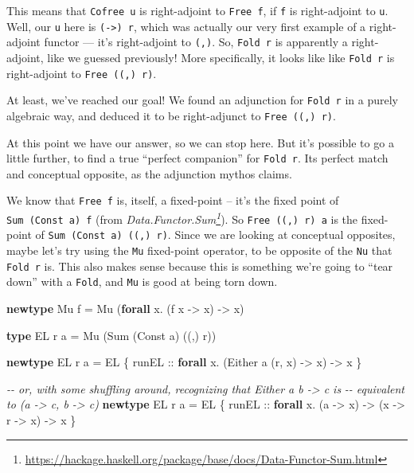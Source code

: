 \documentclass[]{article}
\newenvironment{Shaded}{}{}
\newcommand{\CommentTok}[1]{\textcolor[rgb]{0.38,0.63,0.69}{\textit{#1}}}
\newcommand{\DataTypeTok}[1]{\textcolor[rgb]{0.56,0.13,0.00}{#1}}
\newcommand{\KeywordTok}[1]{\textcolor[rgb]{0.00,0.44,0.13}{\textbf{#1}}}
\newcommand{\NormalTok}[1]{#1}
\newcommand{\OperatorTok}[1]{\textcolor[rgb]{0.40,0.40,0.40}{#1}}
\newcommand{\OtherTok}[1]{\textcolor[rgb]{0.00,0.44,0.13}{#1}}
\renewcommand{\href}[2]{#2\footnote{\url{#1}}}
\begin{document}
This means that \texttt{Cofree\ u} is right-adjoint to \texttt{Free\ f}, if
\texttt{f} is right-adjoint to \texttt{u}. Well, our \texttt{u} here is
\texttt{(-\textgreater{})\ r}, which was actually our very first example of a
right-adjoint functor --- it's right-adjoint to \texttt{(,)}. So,
\texttt{Fold\ r} is apparently a right-adjoint, like we guessed previously! More
specifically, it looks like like \texttt{Fold\ r} is right-adjoint to
\texttt{Free\ ((,)\ r)}.

At least, we've reached our goal! We found an adjunction for \texttt{Fold\ r} in
a purely algebraic way, and deduced it to be right-adjunct to
\texttt{Free\ ((,)\ r)}.

At this point we have our answer, so we can stop here. But it's possible to go a
little further, to find a true ``perfect companion'' for \texttt{Fold\ r}. Its
perfect match and conceptual opposite, as the adjunction mythos claims.

We know that \texttt{Free\ f} is, itself, a fixed-point -- it's the fixed point
of \texttt{Sum\ (Const\ a)\ f} (from
\emph{\href{https://hackage.haskell.org/package/base/docs/Data-Functor-Sum.html}{Data.Functor.Sum}}).
So \texttt{Free\ ((,)\ r)\ a} is the fixed-point of
\texttt{Sum\ (Const\ a)\ ((,)\ r)}. Since we are looking at conceptual
opposites, maybe let's try using the \texttt{Mu} fixed-point operator, to be
opposite of the \texttt{Nu} that \texttt{Fold\ r} is. This also makes sense
because this is something we're going to ``tear down'' with a \texttt{Fold}, and
\texttt{Mu} is good at being torn down.

\begin{Shaded}
\begin{Highlighting}[]
\KeywordTok{newtype} \DataTypeTok{Mu}\NormalTok{ f }\OtherTok{=} \DataTypeTok{Mu}\NormalTok{ (}\KeywordTok{forall}\NormalTok{ x}\OperatorTok{.}\NormalTok{ (f x }\OtherTok{{-}>}\NormalTok{ x) }\OtherTok{{-}>}\NormalTok{ x)}

\KeywordTok{type} \DataTypeTok{EL}\NormalTok{ r a }\OtherTok{=} \DataTypeTok{Mu}\NormalTok{ (}\DataTypeTok{Sum}\NormalTok{ (}\DataTypeTok{Const}\NormalTok{ a) ((,) r))}

\KeywordTok{newtype} \DataTypeTok{EL}\NormalTok{ r a }\OtherTok{=} \DataTypeTok{EL}\NormalTok{ \{}
\OtherTok{    runEL ::} \KeywordTok{forall}\NormalTok{ x}\OperatorTok{.}\NormalTok{ (}\DataTypeTok{Either}\NormalTok{ a (r, x) }\OtherTok{{-}>}\NormalTok{ x) }\OtherTok{{-}>}\NormalTok{ x}
\NormalTok{  \}}

\CommentTok{{-}{-} or, with some shuffling around, recognizing that \textasciigrave{}Either a b {-}> c\textasciigrave{} is}
\CommentTok{{-}{-} equivalent to \textasciigrave{}(a {-}> c, b {-}> c)\textasciigrave{}}
\KeywordTok{newtype} \DataTypeTok{EL}\NormalTok{ r a }\OtherTok{=} \DataTypeTok{EL}\NormalTok{ \{}
\OtherTok{    runEL ::} \KeywordTok{forall}\NormalTok{ x}\OperatorTok{.}\NormalTok{ (a }\OtherTok{{-}>}\NormalTok{ x) }\OtherTok{{-}>}\NormalTok{ (x }\OtherTok{{-}>}\NormalTok{ r }\OtherTok{{-}>}\NormalTok{ x) }\OtherTok{{-}>}\NormalTok{ x}
\NormalTok{  \}}
\end{Highlighting}
\end{Shaded}
\end{document}
